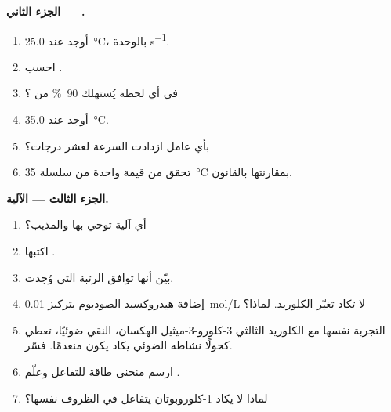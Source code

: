 \begin{problem}
\medskip
\noindent\textbf{الجزء الثاني ---  .}
\begin{enumerate}[resume]
  \item أوجد  عند \qty{25.0}{\celsius}، بالوحدة \unit{s^{-1}}.
  \item احسب .
  \item في أي لحظة يُستهلك \qty{90}{\percent} من ؟
  \item أوجد  عند \qty{35.0}{\celsius}.
  \item بأي عامل ازدادت السرعة لعشر درجات؟
  \item تحقق من قيمة واحدة من سلسلة \qty{35}{\celsius} بمقارنتها بالقانون.
\end{enumerate}

\medskip
\noindent\textbf{الجزء الثالث --- الآلية.}
\begin{enumerate}[resume]
  \item أي آلية توحي بها  والمذيب؟
  \item اكتبها .
  \item بيّن أنها توافق الرتبة التي وُجدت.
  \item إضافة هيدروكسيد الصوديوم بتركيز \qty{0.01}{mol/L} لا تكاد تغيّر
         الكلوريد. لماذا؟
  \item التجربة نفسها مع الكلوريد الثالثي 
        3-كلورو-3-ميثيل الهكسان، النقي ضوئيًا، تعطي كحولًا نشاطه الضوئي
        يكاد يكون منعدمًا. فسّر.
  \item ارسم منحنى طاقة للتفاعل وعلّم
        .
  \item لماذا لا يكاد 1-كلوروبوتان يتفاعل في الظروف نفسها؟
\end{enumerate}


\end{problem}
